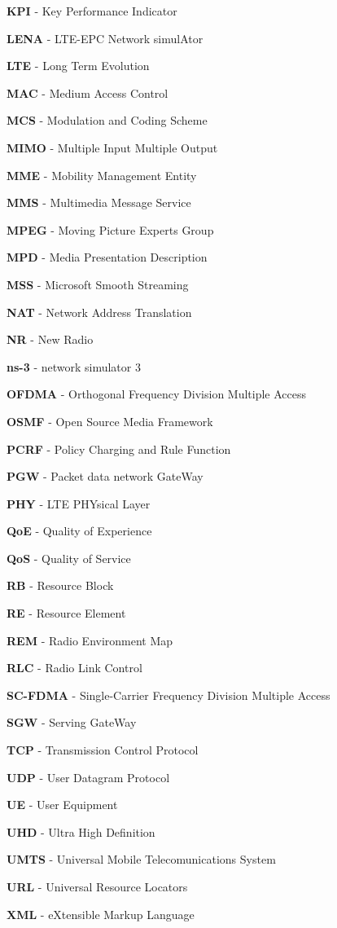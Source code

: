 \textbf{KPI} - Key Performance Indicator

\textbf{LENA} - LTE-EPC Network simulAtor

\textbf{LTE} - Long Term Evolution

\textbf{MAC} - Medium Access Control

\textbf{MCS} - Modulation and Coding Scheme

\textbf{MIMO} - Multiple Input Multiple Output

\textbf{MME} - Mobility Management Entity

\textbf{MMS} - Multimedia Message Service

\textbf{MPEG} - Moving Picture Experts Group

\textbf{MPD} - Media Presentation Description

\textbf{MSS} - Microsoft Smooth Streaming

\textbf{NAT} - Network Address Translation

\textbf{NR} - New Radio

\textbf{ns-3} - network simulator 3

\textbf{OFDMA} - Orthogonal Frequency Division Multiple Access

\textbf{OSMF} - Open Source Media Framework

\textbf{PCRF} - Policy Charging and Rule Function

\textbf{PGW} - Packet data network GateWay

\textbf{PHY} - LTE PHYsical Layer

\textbf{QoE} - Quality of Experience

\textbf{QoS} - Quality of Service

\textbf{RB} - Resource Block

\textbf{RE} - Resource Element

\textbf{REM} - Radio Environment Map

\textbf{RLC} - Radio Link Control

\textbf{SC-FDMA} - Single-Carrier Frequency Division Multiple Access

\textbf{SGW} - Serving GateWay

\textbf{TCP} - Transmission Control Protocol

\textbf{UDP} - User Datagram Protocol

\textbf{UE} - User Equipment

\textbf{UHD} - Ultra High Definition

\textbf{UMTS} - Universal Mobile Telecomunications System

\textbf{URL} - Universal Resource Locators

\textbf{XML} - eXtensible Markup Language


\cleardoublepage
